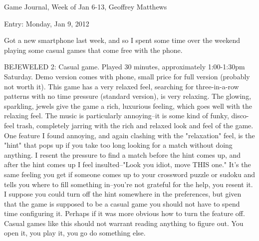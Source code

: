 \documentclass[]{article}
\begin{document}
\setlength{\parindent}{0in}
\tt

Game Journal,
Week of Jan 6-13,
Geoffrey Matthews

Entry:  Monday, Jan 9, 2012

Got a new smartphone last week, and so I spent some time over the
weekend playing some casual games that come free with the phone.

BEJEWELED 2: Casual game.  Played 30 minutes, approximately
1:00-1:30pm Saturday.  Demo version comes with phone, small price for
full version (probably not worth it).  This game has a very relaxed
feel, searching for three-in-a-row patterns with no time pressure
(standard version), is very relaxing.  The glowing, sparkling, jewels
give the game a rich, luxurious feeling, which goes well with the
relaxing feel.  The music is particularly annoying--it is some kind of
funky, disco-feel trash, completely jarring with the rich and relaxed
look and feel of the game.  One feature I found annoying, and again
clashing with the "relaxation" feel, is the "hint" that pops up if you
take too long looking for a match without doing anything.  I resent
the pressure to find a match before the hint comes up, and after the
hint comes up I feel insulted--"Look you idiot, move THIS one."  It's
the same feeling you get if someone comes up to your crossword puzzle
or sudoku and tells you where to fill something in--you're not
grateful for the help, you resent it.  I suppose you could turn off
the hint somewhere in the preferences, but given that the game is
supposed to be a casual game you should not have to spend time
configuring it.  Perhaps if it was more obvious how to turn the
feature off.  Casual games like this should not warrant reading
anything to figure out.  You open it, you play it, you go do something
else.
\end{document}
